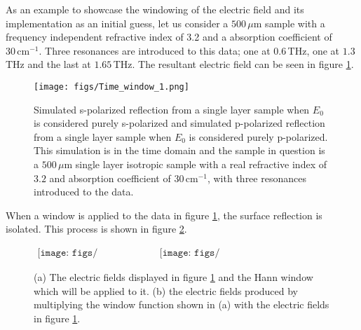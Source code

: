 As an example to showcase the windowing of the electric field and its implementation as an initial guess, let us consider a $500\,\mu$m sample with a frequency independent refractive index of 3.2 and a absorption coefficient of $30\,\text{cm}^{-1}$. Three resonances are introduced to this data; one at $0.6\,$THz, one at $1.3\,$THz and the last at $1.65\,$THz. The resultant electric field can be seen in figure \ref{fig:SingTimeRes}.

\begin{figure}[H]
\begin{center}
	 \texttt{[image: figs/Time\_window\_1.png]}
	 \caption[Simulated single layer isotropic example with strong resonances]{
Simulated s-polarized reflection from a single layer sample when $E_{0}$ is considered purely s-polarized and simulated p-polarized reflection from a single layer sample when $E_{0}$ is considered purely p-polarized. This simulation is in the time domain and the sample in question is a $500\,\mu$m single layer isotropic sample with a real refractive index of $3.2$ and absorption coefficient of $30\,\mbox{cm}^{-1}$, with three resonances introduced to the data.}
   \label{fig:SingTimeRes}
\end{center}
\end{figure}

When a window is applied to the data in figure \ref{fig:SingTimeRes}, the surface reflection is isolated. This process is shown in figure \ref{fig:SingTimeResWin}. 

\begin{figure}[H]
                \begin{center}$
								\begin{array}{cc}
                \texttt{[image: figs/Hann\_1(a).png]}&
                \texttt{[image: figs/Time\_window\_1\_app(b).png]}
								\end{array}$
								\end{center}
	\caption[Simulated single layer isotropic example with strong resonances with Hann window]{(a) The electric fields displayed in figure \ref{fig:SingTimeRes} and the Hann window which will be applied to it. (b) the electric fields produced by multiplying the window function shown in (a) with the electric fields in figure \ref{fig:SingTimeRes}.}
	\label{fig:SingTimeResWin}
\end{figure}

